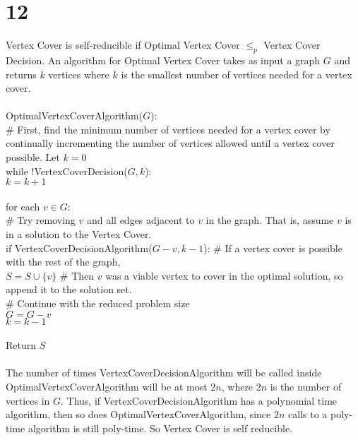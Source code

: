 \documentclass[letterpaper,notitlepage,twoside]{article}
\newcommand\tab[1][1cm]{\hspace*{#1}} %
\begin{document}
\section*{12}
Vertex Cover is self-reducible if Optimal Vertex Cover $\leq_p$ Vertex Cover Decision. An algorithm for Optimal Vertex Cover takes as input a graph $G$ and returns $k$ vertices where $k$ is the smallest number of vertices needed for a vertex cover.
\\\\
OptimalVertexCoverAlgorithm($G$):\\
\# First, find the minimum number of vertices needed for a vertex cover by continually incrementing the number of vertices allowed until a vertex cover possible.
\tab Let $k = 0$\\
\tab while !VertexCoverDecision($G, k$):\\
\tab\tab $k = k + 1$
\\\\
\tab for each $v \in G$:\\
\tab\tab \# Try removing $v$ and all edges adjacent to $v$ in the graph. That is, assume $v$ is in a solution to the Vertex Cover.\\
\tab\tab if VertexCoverDecisionAlgorithm($G - v, k - 1$): \# If a vertex cover is possible with the rest of the graph,\\
\tab\tab\tab $S = S \cup \{v\}$ \# Then $v$ was a viable vertex to cover in the optimal solution, so append it to the solution set.\\
\tab\tab\tab \# Continue with the reduced problem size\\
\tab\tab\tab $G = G - v$\\
\tab\tab\tab $k = k - 1$
\\\\
\tab Return $S$
\\\\
The number of times VertexCoverDecisionAlgorithm will be called inside OptimalVertexCoverAlgorithm will be at most $2n$, where $2n$ is the number of vertices in $G$. Thus, if VertexCoverDecisionAlgorithm has a polynomial time algorithm, then so does OptimalVertexCoverAlgorithm, since $2n$ calls to a poly-time algorithm is still poly-time. So Vertex Cover is self reducible. 
\end{document}
